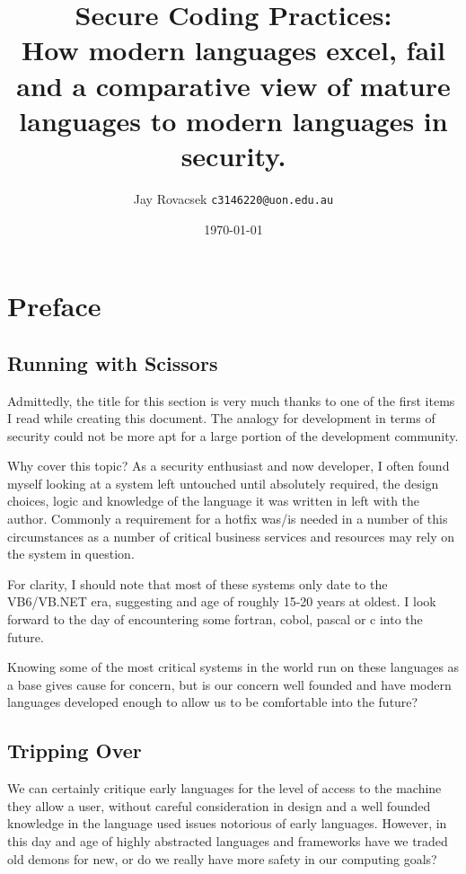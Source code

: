 \documentclass[
    a4paper,
    12pt,
    headings=normal
]{scrreprt}
\title{Secure Coding Practices:
    \protect\\How modern languages excel, fail and a 
    comparative view of mature languages to modern languages in security.}
\author{
        Jay Rovacsek
        \texttt{c3146220@uon.edu.au}\\
    }
\date{\today}
\begin{document}
    \begin{titlingpage}
        \maketitle
    \end{titlingpage}
    \newpage

    \tableofcontents

    \newpage

    \section{Preface}
    \subsection{Running with Scissors}
        Admittedly, the title\cite{Seacord} for this section is very much thanks to one of the first
        items I read while creating this document. The analogy for development in terms of security 
        could not be more apt for a large portion of the development community.

        Why cover this topic? As a security enthusiast and now developer, I often found myself 
        looking at a system left untouched until absolutely required, the design choices, logic and
        knowledge of the language it was written in left with the author. Commonly a requirement 
        for a hotfix was/is needed in a number of this circumstances as a number of critical 
        business services and resources may rely on the system in question.

        For clarity, I should note that most of these systems only date to the VB6/VB.NET era, suggesting
        and age of roughly 15-20 years at oldest. I look forward to the day of encountering some
        fortran, cobol, pascal or c into the future.

        Knowing some of the most critical systems in the world run on these languages as a base
        gives cause for concern, but is our concern well founded and have modern languages 
        developed enough to allow us to be comfortable into the future?

    \subsection{Tripping Over}
        We can certainly critique early languages for the level of access to the machine they allow 
        a user, without careful consideration in design and a well founded knowledge in the language 
        used issues notorious of early languages. However, in this day and age of highly abstracted 
        languages and frameworks have we traded old demons for new, or do we really have more safety
        in our computing goals?
\end{document}
